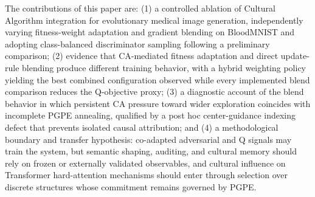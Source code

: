The contributions of this paper are: (1) a controlled ablation of Cultural Algorithm integration for evolutionary medical image generation, independently varying fitness-weight adaptation and gradient blending on BloodMNIST and adopting class-balanced discriminator sampling following a preliminary comparison; (2) evidence that CA-mediated fitness adaptation and direct update-rule blending produce different training behavior, with a hybrid weighting policy yielding the best combined configuration observed while every implemented blend comparison reduces the Q-objective proxy; (3) a diagnostic account of the blend behavior in which persistent CA pressure toward wider exploration coincides with incomplete PGPE annealing, qualified by a post hoc center-guidance indexing defect that prevents isolated causal attribution; and (4) a methodological boundary and transfer hypothesis: co-adapted adversarial and Q signals may train the system, but semantic shaping, auditing, and cultural memory should rely on frozen or externally validated observables, and cultural influence on Transformer hard-attention mechanisms should enter through selection over discrete structures whose commitment remains governed by PGPE.
